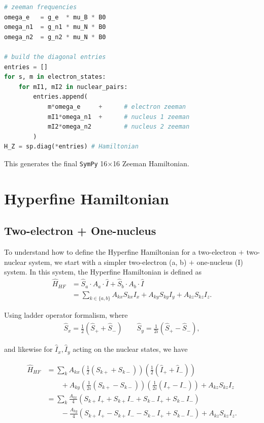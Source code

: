 \documentclass[svgnames]{article}
\begin{document}
\begin{lstlisting}[language=Python] 
# zeeman frequencies
omega_e   = g_e  * mu_B * B0
omega_n1  = g_n1 * mu_N * B0
omega_n2  = g_n2 * mu_N * B0

# build the diagonal entries
entries = []
for s, m in electron_states: 
    for mI1, mI2 in nuclear_pairs:
        entries.append(
            m*omega_e     +      # electron zeeman
            mI1*omega_n1  +      # nucleus 1 zeeman
            mI2*omega_n2         # nucleus 2 zeeman
        )
H_Z = sp.diag(*entries) # Hamiltonian 
\end{lstlisting} 

This generates the final \verb|SymPy| 16$\times$16 Zeeman Hamiltonian. 

\newpage 
\section{Hyperfine Hamiltonian}

\subsection{Two-electron + One-nucleus}
To understand how to define the Hyperfine Hamiltonian for a two-electron $+$
two-nuclear system, we start with a simpler two-electron (a, b)  $+$ one-nucleus
(I) system. In this system, the Hyperfine Hamiltonian is defined as 
\begin{align*}
    \hat{H}_{HF} &= \hat{S}_a \cdot A_a \cdot \hat{I} + \hat{S}_b \cdot A_b \cdot
    \hat{I} \\ 
                 &= \sum_{k\in\{a, b\}}^{} A_{kx} S_{kx} I_x + A_{ky} S_{ky}I_y
                 + A_{kz}S_{kz}I_z. 
\end{align*}

Using ladder operator formalism, where 
\begin{align} \label{raisinglower}
    \hat{S}_x = \frac{1}{2} \left( \hat{S}_+ + \hat{S}_- \right) \qquad
    \hat{S}_y = \frac{1}{2i}\left( \hat{S}_+ - \hat{S}_- \right),  
\end{align} \vspace{3px}

and likewise for $\hat{I}_x, \hat{I}_y$ acting on the nuclear states, we have 

\begin{align*}
    \hat{H}_{HF} &= \sum_{k}^{} A_{kx} \left( \frac{1}{2} \left( S_{k+} + S_{k-}
    \right)   \right) \left( \frac{1}{2}\left( \hat{I}_+ + \hat{I}_- \right)
    \right)  \\ 
                 &\qquad+ A_{ky} \left( \frac{1}{2i} \left( S_{k+} - S_{k-} \right)
                 \right) \left( \frac{1}{2i} \left( I_+ - I_- \right)   \right)
                 + A_{kz} S_{kz}I_z \\ 
                 &= \sum_{k}^{} \frac{A_{kx}}{4} \left( S_{k+}I_+ + S_{k+}I_- +
                 S_{k-}I_+ + S_{k-}I_- \right) \\ 
                 &\qquad- \frac{A_{ky}}{4} \left( S_{k+}I_+ - S_{k+}I_- - S_{k-}I_+ +
                 S_{k-}I_- \right) + A_{kz} S_{kz} I_z.  
\end{align*}
\end{document}
